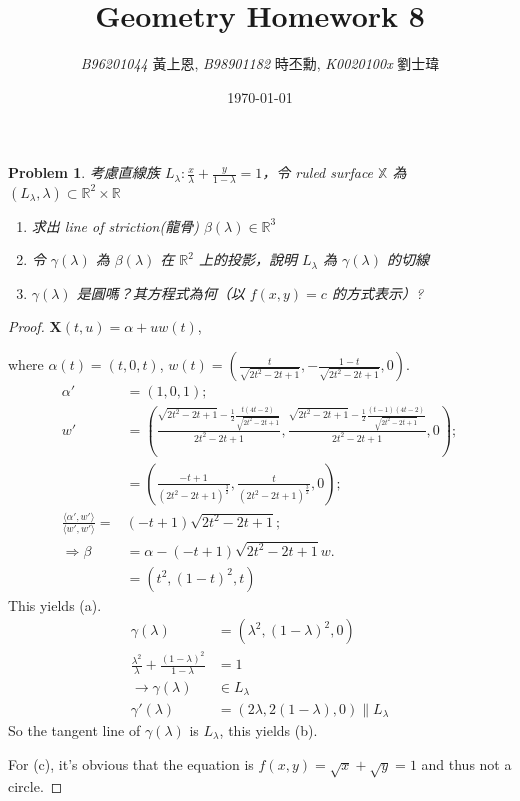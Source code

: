 \documentclass[10pt,a4paper]{article}
\newcommand{\LiHei}{\CJKfamily{lh}}
\newcounter{theProblemCounter}
\newtheorem{problem}[theProblemCounter]{Problem}
\begin{document}
\title{{Geometry Homework 8}}
\author{{\it{B96201044}} {\LiHei 黃上恩}, {\it{B98901182}} {\LiHei 時丕勳}, {\it{K0020100x}} {\LiHei 劉士瑋}}%
\date{\today}
\maketitle

\newcommand{\bx}{\mathbb{X}}
\newcommand{\bfx}{\mathbf{X}}
\newcommand{\sech}{\mbox{sech}}
\setcounter{theProblemCounter}{1}
\begin{problem}
考慮直線族 $L_\lambda: \frac{x}{\lambda} + \frac{y}{1-\lambda}=1$，令 ruled surface $\bx$ 為 $(L_\lambda, \lambda)\subset \mathbb{R}^2\times \mathbb{R}$
\begin{enumerate}
\item[(a)] 求出 line of striction(龍骨) $\beta(\lambda)\in\mathbb{R}^3$
\item[(b)] 令 $\gamma(\lambda)$ 為 $\beta(\lambda)$ 在 $\mathbb{R}^2$ 上的投影，說明 $L_\lambda$ 為 $\gamma(\lambda)$ 的切線
\item[(c)] $\gamma(\lambda)$ 是圓嗎？其方程式為何（以 $f(x,y)=c$ 的方式表示）?
\end{enumerate}
\end{problem}
\begin{proof}
$\bfx(t, u) = \alpha + uw(t)$, \par  where $\alpha(t) = (t, 0, t)$, $w(t) = (\frac{t}{\sqrt{2t^2-2t+1}}, -\frac{1-t}{\sqrt{2t^2-2t+1}}, 0)$.
\begin{align*}
\alpha' &= (1, 0, 1); \\
w' &= (\frac{\sqrt{2t^2-2t+1}-\frac{1}{2}\frac{t(4t-2)}{\sqrt{2t^2-2t+1}}}{2t^2-2t+1}, \frac{\sqrt{2t^2-2t+1}-\frac{1}{2}\frac{(t-1)(4t-2)}{\sqrt{2t^2-2t+1}}}{2t^2-2t+1}, 0); \\
&= (\frac{-t+1}{(2t^2-2t+1)^{\frac{3}{2}}}, \frac{t}{(2t^2-2t+1)^{\frac{3}{2}}}, 0); \\
\frac{\langle \alpha', w'\rangle}{\langle w', w'\rangle} =& (-t+1)\sqrt{2t^2-2t+1}; \\
\Rightarrow \beta &= \alpha-(-t+1)\sqrt{2t^2-2t+1}w.\\
&= (t^2,(1-t)^2,t)
\end{align*}
This yields (a).
\begin{align*}
\gamma(\lambda) &= (\lambda^2,(1-\lambda)^2,0)\\
\frac{\lambda^2}{\lambda}+\frac{(1-\lambda)^2}{1-\lambda}&=1\\
\rightarrow \gamma(\lambda) &\in L_{\lambda}\\
\gamma'(\lambda) &=(2\lambda,2(1-\lambda),0)\parallel L_\lambda
\end{align*}
So the tangent line of $\gamma(\lambda)$ is $L_\lambda$, this yields (b). \par
For (c), it's obvious that the equation is $f(x, y) = \sqrt{x}+\sqrt{y} = 1$ and thus not a circle.

\end{proof}
\end{document}
